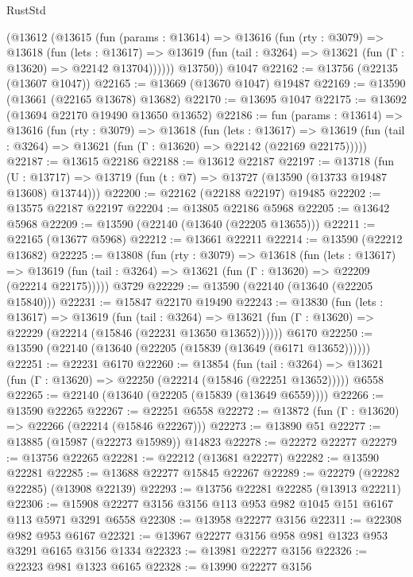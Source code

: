 \begin{lexlean}{RustStd}
\begin{coremodule}
      (@13612
        (@13615
          (fun (params : @13614) =>
          @13616
            (fun (rty : @3079) =>
            @13618
              (fun (lets : @13617) =>
              @13619 (fun (tail : @3264) => @13621 (fun (Γ : @13620) => @22142 @13704))))))
        @13750))
    @1047
@22162 := @13756 (@22135 (@13607 @1047))
@22165 := @13669 (@13670 @1047) @19487
@22169 := @13590 (@13661 (@22165 @13678) @13682)
@22170 := @13695 @1047
@22175 := @13692 (@13694 @22170 @19490 @13650 @13652)
@22186 := fun (params : @13614) =>
  @13616
    (fun (rty : @3079) =>
    @13618
      (fun (lets : @13617) =>
      @13619 (fun (tail : @3264) => @13621 (fun (Γ : @13620) => @22142 (@22169 @22175)))))
@22187 := @13615 @22186
@22188 := @13612 @22187
@22197 := @13718
    (fun (U : @13717) => @13719 (fun (t : @7) => @13727 (@13590 (@13733 @19487 @13608) @13744)))
@22200 := @22162 (@22188 @22197) @19485
@22202 := @13575 @22187 @22197
@22204 := @13805 @22186 @5968
@22205 := @13642 @5968
@22209 := @13590 (@22140 (@13640 (@22205 @13655)))
@22211 := @22165 (@13677 @5968)
@22212 := @13661 @22211
@22214 := @13590 (@22212 @13682)
@22225 := @13808
    (fun (rty : @3079) =>
    @13618
      (fun (lets : @13617) =>
      @13619 (fun (tail : @3264) => @13621 (fun (Γ : @13620) => @22209 (@22214 @22175)))))
    @3729
@22229 := @13590 (@22140 (@13640 (@22205 @15840)))
@22231 := @15847 @22170 @19490
@22243 := @13830
    (fun (lets : @13617) =>
    @13619
      (fun (tail : @3264) =>
      @13621 (fun (Γ : @13620) => @22229 (@22214 (@15846 (@22231 @13650 @13652))))))
    @6170
@22250 := @13590 (@22140 (@13640 (@22205 (@15839 (@13649 (@6171 @13652))))))
@22251 := @22231 @6170
@22260 := @13854
    (fun (tail : @3264) => @13621 (fun (Γ : @13620) => @22250 (@22214 (@15846 (@22251 @13652)))))
    @6558
@22265 := @22140 (@13640 (@22205 (@15839 (@13649 @6559))))
@22266 := @13590 @22265
@22267 := @22251 @6558
@22272 := @13872 (fun (Γ : @13620) => @22266 (@22214 (@15846 @22267)))
@22273 := @13890 @51
@22277 := @13885 (@15987 (@22273 @15989)) @14823
@22278 := @22272 @22277
@22279 := @13756 @22265
@22281 := @22212 (@13681 @22277)
@22282 := @13590 @22281
@22285 := @13688 @22277 @15845 @22267
@22289 := @22279 (@22282 @22285) (@13908 @22139)
@22293 := @13756 @22281 @22285 (@13913 @22211)
@22306 := @15908 @22277 @3156 @3156 @113 @953 @982 @1045 @151 @6167 @113 @5971 @3291 @6558
@22308 := @13958 @22277 @3156
@22311 := @22308 @982 @953 @6167
@22321 := @13967 @22277 @3156 @958 @981 @1323 @953 @3291 @6165 @3156 @1334
@22323 := @13981 @22277 @3156
@22326 := @22323 @981 @1323 @6165
@22328 := @13990 @22277 @3156

\end{coremodule}
\end{lexlean}
